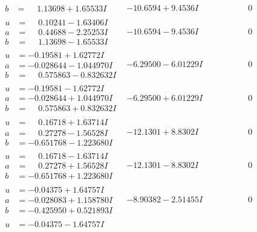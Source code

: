 \documentclass[1p]{elsarticle_modified}
\theoremstyle{definition}
\begin{document}
$$\begin{array}{c|c|c}
\begin{aligned}
b &= \phantom{-}1.13698 + 1.65533 I\end{aligned}
 & -10.6594 + 9.4536 I & \phantom{-0.000000 } 0 \\ \hline\begin{aligned}
u &= \phantom{-}0.10241 - 1.63406 I \\
a &= \phantom{-}0.44688 - 2.25253 I \\
b &= \phantom{-}1.13698 - 1.65533 I\end{aligned}
 & -10.6594 - 9.4536 I & \phantom{-0.000000 } 0 \\ \hline\begin{aligned}
u &= -0.19581 + 1.62772 I \\
a &= -0.028644 - 1.044970 I \\
b &= \phantom{-}0.575863 - 0.832632 I\end{aligned}
 & -6.29500 - 6.01229 I & \phantom{-0.000000 } 0 \\ \hline\begin{aligned}
u &= -0.19581 - 1.62772 I \\
a &= -0.028644 + 1.044970 I \\
b &= \phantom{-}0.575863 + 0.832632 I\end{aligned}
 & -6.29500 + 6.01229 I & \phantom{-0.000000 } 0 \\ \hline\begin{aligned}
u &= \phantom{-}0.16718 + 1.63714 I \\
a &= \phantom{-}0.27278 - 1.56528 I \\
b &= -0.651768 - 1.223680 I\end{aligned}
 & -12.1301 + 8.8302 I & \phantom{-0.000000 } 0 \\ \hline\begin{aligned}
u &= \phantom{-}0.16718 - 1.63714 I \\
a &= \phantom{-}0.27278 + 1.56528 I \\
b &= -0.651768 + 1.223680 I\end{aligned}
 & -12.1301 - 8.8302 I & \phantom{-0.000000 } 0 \\ \hline\begin{aligned}
u &= -0.04375 + 1.64757 I \\
a &= -0.028083 + 1.158780 I \\
b &= -0.425950 + 0.521893 I\end{aligned}
 & -8.90382 - 2.51455 I & \phantom{-0.000000 } 0 \\ \hline\begin{aligned}
u &= -0.04375 - 1.64757 I \\

\end{aligned}
\end{array}$$
\end{document}
